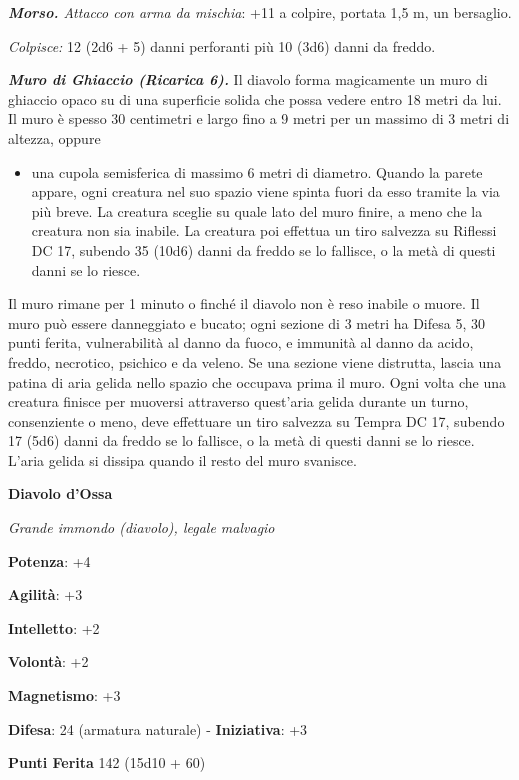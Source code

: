 \begin{multicols}{2}
\emph{\textbf{Morso.} Attacco con arma da mischia}: +11 a colpire,
portata 1,5 m, un bersaglio.

\emph{Colpisce:} 12 (2d6 + 5) danni perforanti più 10 (3d6) danni da
freddo.




\emph{\textbf{Muro di Ghiaccio (Ricarica 6).}} Il diavolo forma
magicamente un muro di ghiaccio opaco su di una superficie solida che
possa vedere entro 18 metri da lui. Il muro è spesso 30 centimetri e
largo fino a 9 metri per un massimo di 3 metri di altezza, oppure


\begin{itemize}
\item
  una cupola semisferica di massimo 6 metri di diametro. Quando la
  parete appare, ogni creatura nel suo spazio viene spinta fuori da esso
  tramite la via più breve. La creatura sceglie su quale lato del muro
  finire, a meno che la creatura non sia inabile. La creatura poi
  effettua un tiro salvezza su Riflessi DC 17, subendo 35 (10d6) danni
  da freddo se lo fallisce, o la metà di questi danni se lo riesce.
\end{itemize}


Il muro rimane per 1 minuto o finché il diavolo non è reso inabile o
muore. Il muro può essere danneggiato e bucato; ogni sezione di 3 metri
ha Difesa 5, 30 punti ferita, vulnerabilità al danno da fuoco, e immunità al
danno da acido, freddo, necrotico, psichico e da veleno. Se una sezione
viene distrutta, lascia una patina di aria gelida nello spazio che
occupava prima il muro. Ogni volta che una creatura finisce per muoversi
attraverso quest'aria gelida durante un turno, consenziente o meno, deve
effettuare un tiro salvezza su Tempra DC 17, subendo 17 (5d6)
danni da freddo se lo fallisce, o la metà di questi danni se lo riesce.
L'aria gelida si dissipa quando il resto del muro svanisce.


\textbf{Diavolo d'Ossa}

\emph{Grande immondo (diavolo), legale malvagio}

\textbf{Potenza}: +4

\textbf{Agilità}: +3

\textbf{Intelletto}: +2

\textbf{Volontà}: +2

\textbf{Magnetismo}: +3

\textbf{Difesa}: 24 (armatura naturale) - \textbf{Iniziativa}: +3

\textbf{Punti Ferita} 142 (15d10 + 60)


\end{multicols}
